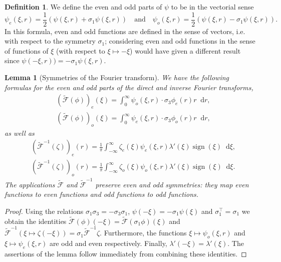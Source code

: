 \documentclass[11 pt]{amsart}
\newtheorem{lem}{Lemma}[section]
\theoremstyle{definition}
\newtheorem{df}[thm]{Definition}
\theoremstyle{remark}
\numberwithin{equation}{section}
\newcommand{\dd}{\mathop{}\!\mathrm{d}}
\begin{document}
\begin{df}
We define the even and odd parts of $\psi$ to be in the vectorial sense
$$
\psi_e(\xi,r)=\frac12(\psi(\xi,r)+\sigma_1 \psi(\xi,r)) \quad \mbox{and} \quad \psi_o(\xi,r)=\frac12(\psi(\xi,r)-\sigma_1 \psi(\xi,r)).
$$
In this formula, even and odd functions are defined in the sense of vectors, i.e. with respect to the symmetry $\sigma_1$; considering even and odd functions in the sense of functions of $\xi$ (with respect to $\xi \mapsto -\xi$) would have given a different result since $\psi(-\xi,r))=-\sigma_1 \psi(\xi,r)$.
\end{df}

\begin{lem}[Symmetries of the Fourier transform] \label{lem:fourier-symmetries}
We have the following formulas for the even and odd parts of the direct and inverse Fourier transforms,
\begin{align}
\label{even-part-direct-fourier} & (\widetilde{\mathcal F}(\phi))_e(\xi)= \int_0^\infty \psi_o (\xi,r) \cdot\sigma_3 \phi_e(r)r\dd r,\\
\label{odd-part-direct-fourier}& (\widetilde{\mathcal F}(\phi))_o(\xi)= \int_0^\infty \psi_e(\xi,r) \cdot \sigma_3 \phi_o (r)r\dd r,
\end{align}
as well as
\begin{align}
\label{even-part-inverse-fourier}& (\widetilde{\mathcal F}^{-1}(\zeta))_e(r)= \frac 1 \pi \int_{-\infty}^\infty \zeta_e(\xi) \psi_e (\xi,r)\lambda'(\xi) \operatorname{sign}( \xi) \dd \xi,\\
\label{odd-part-inverse-fourier} & (\widetilde{\mathcal F}^{-1}(\zeta))_o(r)= \frac 1 \pi \int_{-\infty}^\infty \zeta_o(\xi) \psi_o (\xi,r)\lambda'(\xi) \operatorname{sign}( \xi) \dd \xi.
\end{align}
The applications $\widetilde{\mathcal{F}}$ and $\widetilde{\mathcal{F}}^{-1}$ preserve even and odd symmetries: they map even functions to even functions and odd functions to odd functions.
\end{lem}

\begin{proof}
Using the relations $\sigma_1\sigma_3=-\sigma_3\sigma_1$, $\psi(-\xi)=-\sigma_1\psi(\xi)$ and $\sigma_1^\top=\sigma_1$ we obtain the identities $\widetilde{\mathcal F}(\phi)(-\xi)=\widetilde{\mathcal F}(\sigma_1 \phi)(\xi)$ and $\widetilde{\mathcal F}^{-1}(\xi\mapsto \zeta(-\xi))=\sigma_1 \widetilde{\mathcal F}^{-1}\zeta$. Furthermore, the functions $\xi \mapsto \psi_o(\xi,r)$ and $\xi \mapsto \psi_e (\xi,r)$ are odd and even respectively. Finally, $\lambda'(-\xi)=\lambda'(\xi)$. The assertions of the lemma follow immediately from combining these identities.
\end{proof}
\end{document}
